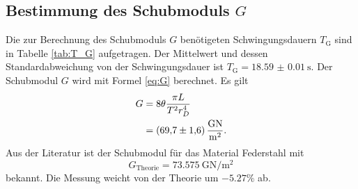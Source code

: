 \subsection{Bestimmung des Schubmoduls \texorpdfstring{$G$}{G}}

Die zur Berechnung des Schubmoduls $G$ benötigeten Schwingungsdauern $T_\text{G}$ sind in Tabelle \ref{tab:T_G} aufgetragen.
Der Mittelwert und dessen Standardabweichung von der Schwingungsdauer ist $T_\text{G}=\SI{18.59(1)}{\second}$.
Der Schubmodul $G$ wird mit Formel \eqref{eq:G} berechnet.
Es gilt
\begin{align}
	G 	&=  8 \theta\frac{\pi L}{T^2 r_D^4}\\%
		&=	\SI{69.7\pm1.6}{\giga\newton\per\meter\squared}.
	\label{eq:schubmodul}
	\end{align}
Aus der Literatur ist der Schubmodul für das Material Federstahl mit
\begin{equation}
	G_\text{Theorie} = \SI{73.575}{\giga\newton\per\meter\squared}
\end{equation}bekannt.
Die Messung weicht von der Theorie um $-5.27\%$ ab.
